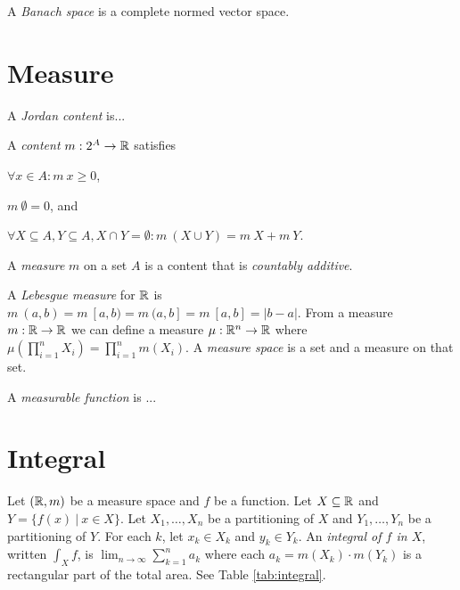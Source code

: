 %
%
A \emph{Banach space} is a complete normed vector space.

\section{Measure}

A \emph{Jordan content} is...

%
A \emph{content} \(m : 2^A \to \mathbb{R}\) satisfies
\begin{enumerate*}[label={(\arabic*)}]
    \item \(\forall x \in A : m~x \ge 0\),
    \item \(m~\emptyset = 0\), and
    \item \(\forall X \subseteq A, Y \subseteq A, X \cap Y = \emptyset : m~(X \cup Y) = m~X + m~Y\).
\end{enumerate*}

%
%
%
A \emph{measure} \(m\) on a set \(A\) is a content that is \emph{countably additive}.

%
%
A \emph{Lebesgue measure} for \(\mathbb{R}\) is
\(m~(a,b) = m~[a,b) = m~(a,b] = m~[a,b] = |b-a|\).
From a measure \(m : \mathbb{R} \to \mathbb{R}\)
we can define a measure \(\mu : \mathbb{R}^n \to \mathbb{R}\)
where
\(\mu \left( \prod_{i=1}^n X_i \right) = \prod_{i=1}^n m(X_i)\).
%
%
%
A \emph{measure space} is a set and a measure on that set.

%
%
A \emph{measurable function} is ...

\section{Integral}

%
%
%
%
%
Let \((\mathbb{R},m)\) be a measure space and \(f\) be a function.
Let \(X \subseteq \mathbb{R}\) and \(Y = \{ f(x) ~|~ x \in X\}\).
Let \(X_1,\ldots,X_n\) be a partitioning of \(X\) and \(Y_1,\ldots,Y_n\) be a partitioning of \(Y\).
For each \(k\), let \(x_k \in X_k\) and \(y_k \in Y_k\).
An \emph{integral of \(f\) in \(X\)}, written \(\int_X f\),
is \(\lim_{n\to\infty} \sum_{k=1}^{n} a_k\)
where each \(a_k = m(X_k) \cdot m(Y_k)\) is a rectangular part of the total area.
See Table \ref{tab:integral}.

